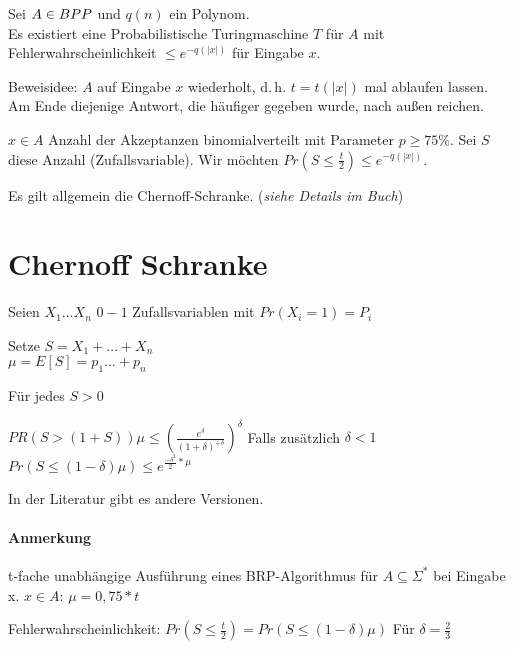 \begin{satz}
    Sei $A \in BPP$ und $q(n)$ ein Polynom.
    \\
    Es existiert eine Probabilistische Turingmaschine $T$ für $A$
    mit Fehlerwahrscheinlichkeit $\leq e^{-q(|x|)}$ für Eingabe $x$.
\end{satz}
\begin{beweis}
    Beweisidee: $A$ auf Eingabe $x$ wiederholt, d.\,h. $t = t(|x|)$ mal ablaufen lassen.
    Am Ende diejenige Antwort, die häufiger gegeben wurde, nach außen reichen.

    $x \in A$ Anzahl der Akzeptanzen binomialverteilt mit Parameter $p \geq 75\%$.
    Sei $S$ diese Anzahl (Zufallsvariable).
    Wir möchten $Pr(S \leq \frac{t}{2}) \leq e^{-q(|x|)}$.

    Es gilt allgemein die Chernoff-Schranke.
    (\textit{siehe Details im Buch})

\end{beweis}












\section{Chernoff Schranke}
Seien $X_1 \dots X_n$ $0-1$
Zufallsvariablen mit $Pr(X_i=1) = P_i$

Setze $S=X_1 + \dots + X_n$ \\
$\mu = E[S] = p_1 \dots  + p_n$

Für jedes $S > 0$

$PR (S>(1+S)) \mu \leq (\frac{e^\delta}{(1+\delta)^{+\delta}})^\delta$
Falls zusätzlich $\delta < 1$ \\
$Pr(S\leq (1- \delta) \mu ) \leq e^{\frac{- \delta^2}{2} * \mu}$

In der Literatur gibt es andere Versionen.

\paragraph{Anmerkung}
t-fache unabhängige Ausführung eines BRP-Algorithmus für
$A\subseteq \Sigma^*$ bei Eingabe x. $x \in A$: $\mu = 0,75 * t$

Fehlerwahrscheinlichkeit:
$Pr(S\leq \frac{t}{2}) = Pr(S \leq (1 - \delta) \mu)$
Für $\delta = \frac{2}{3}$

